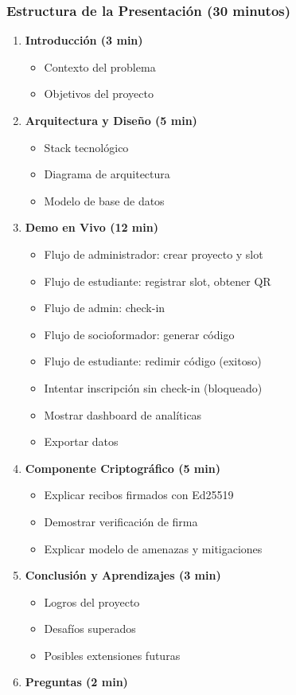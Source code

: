 \documentclass[12pt,a4paper]{article}
\begin{document}
\subsubsection{Estructura de la Presentación (30 minutos)}

\begin{enumerate}
    \item \textbf{Introducción (3 min)}
    \begin{itemize}
        \item Contexto del problema
        \item Objetivos del proyecto
    \end{itemize}
    
    \item \textbf{Arquitectura y Diseño (5 min)}
    \begin{itemize}
        \item Stack tecnológico
        \item Diagrama de arquitectura
        \item Modelo de base de datos
    \end{itemize}
    
    \item \textbf{Demo en Vivo (12 min)}
    \begin{itemize}
        \item Flujo de administrador: crear proyecto y slot
        \item Flujo de estudiante: registrar slot, obtener QR
        \item Flujo de admin: check-in
        \item Flujo de socioformador: generar código
        \item Flujo de estudiante: redimir código (exitoso)
        \item Intentar inscripción sin check-in (bloqueado)
        \item Mostrar dashboard de analíticas
        \item Exportar datos
    \end{itemize}
    
    \item \textbf{Componente Criptográfico (5 min)}
    \begin{itemize}
        \item Explicar recibos firmados con Ed25519
        \item Demostrar verificación de firma
        \item Explicar modelo de amenazas y mitigaciones
    \end{itemize}
    
    \item \textbf{Conclusión y Aprendizajes (3 min)}
    \begin{itemize}
        \item Logros del proyecto
        \item Desafíos superados
        \item Posibles extensiones futuras
    \end{itemize}
    
    \item \textbf{Preguntas (2 min)}
\end{enumerate}
\end{document}
